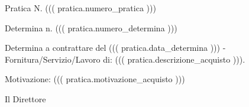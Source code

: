 \documentclass[a4paper,12pt]{letter}
\begin{document}
\topaddr

{\small Pratica N. ((( pratica.numero_pratica ))) }
\vspace{1cm}

\begin{flushright}

Determina n. ((( pratica.numero_determina )))
\end{flushright}

Determina a contrattare del ((( pratica.data_determina ))) - Fornitura/Servizio/Lavoro di: ((( pratica.descrizione_acquisto ))).

Motivazione: ((( pratica.motivazione_acquisto )))
\vspace{0.5cm}

\begin{center}
Il Direttore
\end{center}

\vspace{0.5 cm}
\end{document}
